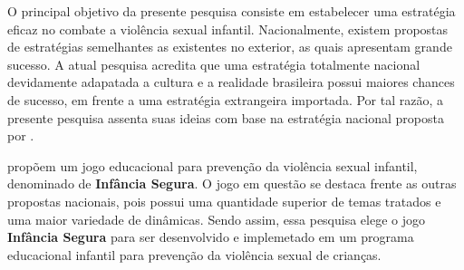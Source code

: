 

O principal objetivo da presente pesquisa consiste em estabelecer uma estratégia eficaz no combate a violência sexual infantil. Nacionalmente, existem propostas de estratégias semelhantes as existentes no exterior, as quais apresentam grande sucesso. A atual pesquisa acredita que uma estratégia totalmente nacional devidamente adapatada a cultura e a realidade brasileira possui maiores chances de sucesso, em frente a uma estratégia extrangeira importada. Por tal razão, a presente pesquisa assenta suas ideias com base na estratégia nacional proposta por .

 propõem um jogo educacional para prevenção da violência sexual infantil, denominado de \textbf{Infância Segura}. O jogo em questão se destaca frente as outras propostas nacionais, pois possui uma quantidade superior de temas tratados e uma maior variedade de dinâmicas. Sendo assim, essa pesquisa elege o jogo \textbf{Infância Segura} para ser desenvolvido e implemetado em um programa educacional infantil para prevenção da violência sexual de crianças. 

